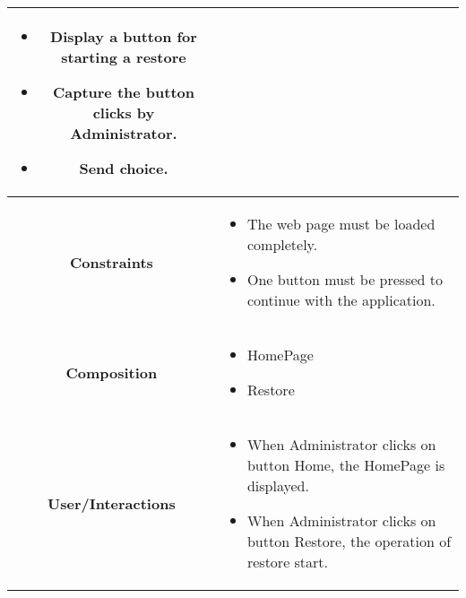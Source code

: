 \documentclass[11pt, a4paper,titlepage]{article}
\begin{document}
\begin{enumerate}
\begin{tabularx}{\textwidth}{| c | X |}
\begin{itemize}
		\item Display a button for starting a restore
		\item Capture the button clicks by Administrator.
		\item Send choice.
	\end{itemize}
	\\
	\hline
	\textbf{Constraints} &
	\begin{itemize}
		\item  The web page must be loaded completely.
		\item One button must be pressed to continue with the application.
	\end{itemize}
	\\
	\hline
	\textbf{Composition} &
	\begin{itemize}
		\item HomePage
		\item Restore
	\end{itemize}
	\\
	\hline
	\textbf{User/Interactions} &
	\begin{itemize}
		\item When Administrator clicks on button Home, the HomePage is displayed.
		\item When Administrator clicks on button Restore, the operation of restore start.
	\end{itemize}
	\\
	\hline 
\end{tabularx}


\end{enumerate}
\end{document}
